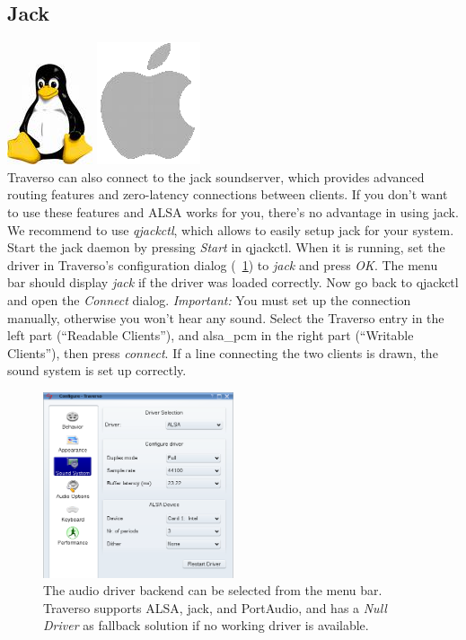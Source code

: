 \subsection{Jack}
\includegraphics[height=\baselineskip]{../images/tux.png}
\includegraphics[height=\baselineskip]{../images/mac.png}
\\
Traverso can also connect to the jack soundserver, which provides advanced routing features and zero-latency connections between clients. If you don't want to use these features and ALSA works for you, there's no advantage in using jack. We recommend to use \emph{qjackctl}, which allows to easily setup jack for your system. Start the jack daemon by pressing \emph{Start} in qjackctl. When it is running, set the driver in Traverso's configuration dialog (\FigB\ \ref{fig_driverconf}) to \emph{jack} and press \emph{OK}. The menu bar should display \emph{jack} if the driver was loaded correctly. Now go back to qjackctl and open the \emph{Connect} dialog. \emph{Important:} You must set up the connection manually, otherwise you won't hear any sound. Select the Traverso entry in the left part (``Readable Clients''), and alsa\_pcm in the right part (``Writable Clients''), then press \emph{connect}. If a line connecting the two clients is drawn, the sound system is set up correctly.

\begin{figure}
 \centering\includegraphics[width=0.5\textwidth]{../images/sshot02.png}
 \caption{The audio driver backend can be selected from the menu bar. Traverso supports ALSA, jack, and PortAudio, and has a \emph{Null Driver} as fallback solution if no working driver is available.}
 \label{fig_driverconf}
\end{figure}

